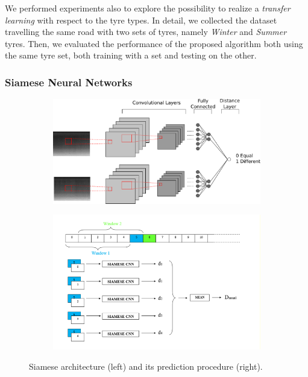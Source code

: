 We performed experiments also to explore the possibility to realize a \textit{transfer learning} with respect to the tyre types. In detail, we collected the dataset travelling the same road with two sets of tyres, namely \textit{Winter} and \textit{Summer} tyres. Then, we evaluated the performance of the proposed algorithm both using the same tyre set, both training with a set and testing on the other.

\subsubsection{Siamese Neural Networks}

\begin{figure}[h]
	\centering
	\begin{subfigure}{0.48\textwidth}
		\centering
		\includegraphics[width=\columnwidth]{img/Siamese_road}
	\end{subfigure} 
	\hfill	
	\begin{subfigure}{0.48\textwidth}
		\centering   
		\includegraphics[width=\columnwidth]{img/siamese_predict}
	\end{subfigure} 
	\caption[Siamese Architecture]{Siamese architecture (left) and its prediction procedure (right).}
	\label{fig:siamese_road}
\end{figure}


